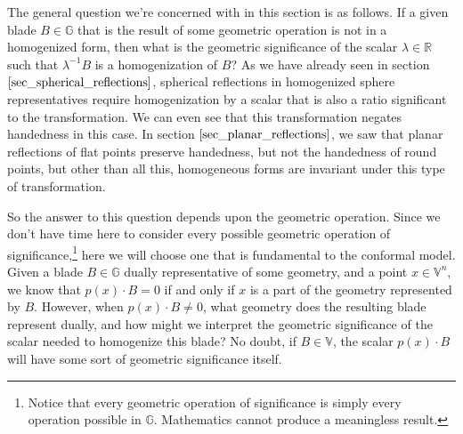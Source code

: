 \documentclass[12pt]{article}
\newcommand{\G}{\mathbb{G}}
\newcommand{\V}{\mathbb{V}}
\newcommand{\R}{\mathbb{R}}
\begin{document}
The general question we're concerned with in this section is as follows.
If a given blade $B\in\G$ that is the result of some geometric operation is
not in a homogenized form, then what is the geometric significance of the scalar
$\lambda\in\R$ such that $\lambda^{-1}B$ is a homogenization of $B$?
As we have already seen in section $\eqref{sec_spherical_reflections}$,
spherical reflections in homogenized sphere representatives require homogenization
by a scalar that is also a ratio significant to the transformation.
We can even see that this transformation negates handedness in this case.
In section $\eqref{sec_planar_reflections}$, we saw that planar reflections
of flat points preserve handedness, but not the handedness of round points, but
other than all this, homogeneous forms are invariant under this type of transformation.

So the answer to this question depends upon the geometric operation.
Since we don't have time here to consider every possible geometric
operation of significance,\footnote{Notice that every geometric operation
of significance is simply every operation possible in $\G$.  Mathematics
cannot produce a meaningless result.}
here we will choose one that is fundamental
to the conformal model.
Given a blade $B\in\G$ dually representative
of some geometry, and a point $x\in\V^n$, we know that $p(x)\cdot B=0$
if and only if $x$ is a part of the geometry represented by $B$.  However,
when $p(x)\cdot B\neq 0$, what geometry does the resulting blade represent dually,
and how might we interpret the geometric significance of the scalar needed to
homogenize this blade?  No doubt, if $B\in\V$, the scalar $p(x)\cdot B$ will
have some sort of geometric significance itself.
\end{document}
